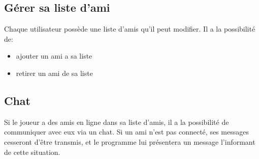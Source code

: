 \documentclass[../besoin_user.tex]{subfiles}
\begin{document}
\subsection{Gérer sa liste d'ami}
Chaque utilisateur possède une liste d'amis qu'il peut modifier. Il a la possibilité de:
\begin{itemize}
    \item ajouter un ami a sa liste
    \item retirer un ami de sa liste
\end{itemize}

\subsection{Chat}
Si le joueur a des amis en ligne dans sa liste d'amis, il a la possibilité de communiquer avec eux via un chat. 
Si un ami n'est pas connecté, ses messages cesseront d'être transmis, et le programme lui présentera un message l'informant de cette situation.
\end{document}
